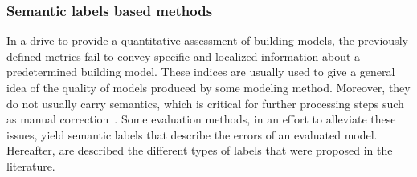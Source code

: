         \subsubsection{Semantic labels based methods}
            In a drive to provide a quantitative assessment of building models, the previously defined metrics fail to convey specific and localized information about a predetermined building model.
            These indices are usually used to give a general idea of the quality of models produced by some modeling method.
            Moreover, they do not usually carry semantics, which is critical for further processing steps such as manual correction~\parencite{elberink2011quality}.
            Some evaluation methods, in an effort to alleviate these issues, yield semantic labels that describe the errors of an evaluated model.
            Hereafter, are described the different types of labels that were proposed in the literature.\\

